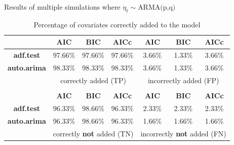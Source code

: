 \documentclass[10pt]{beamer}
\begin{document}
\begin{frame}{Results of multiple simulations where $\eta_t\sim\text{ARMA(p,q)}$}

    \begin{table}
        \centering\small 
        \renewcommand{\arraystretch}{1.3}
        \setlength{\tabcolsep}{10pt}
        \label{simulations1}
        \caption{Percentage of covariates correctly added to the model}
        \begin{tabular}{|c|ccc|ccc|}
            \cline{2-7}
            \multicolumn{1}{c|}{}   & \textbf{AIC}  & \textbf{BIC}  & \textbf{AICc}            & \textbf{AIC}      & \textbf{BIC}   & \textbf{AICc} \\
            \hline       
            \textbf{adf.test}       & 97.66\%       & 97.66\%        & 97.66\%                 & 3.66\%            & 1.33\%         & 3.66\%        \\
            \textbf{auto.arima}     & 98.33\%       & 98.33\%        & 98.33\%                 & 3.66\%            & 1.33\%         & 3.66\%        \\
            \hline
            \multicolumn{1}{|c|}{}   & \multicolumn{3}{c|}{correctly added (TP)}               & \multicolumn{3}{c|}{incorrectly added (FP)}         \\
            \hline 
            \multicolumn{7}{c}{}                                                                                                                    \\
            \cline{2-7}
            \multicolumn{1}{c|}{}   & \textbf{AIC}  & \textbf{BIC}  & \textbf{AICc}           & \textbf{AIC}      & \textbf{BIC}   & \textbf{AICc}  \\ 
            \hline        
            \textbf{adf.test}       & 96.33\%       & 98.66\%        & 96.33\%                & 2.33\%            & 2.33\%         & 2.33\%         \\
            \textbf{auto.arima}     & 96.33\%       & 98.66\%        & 96.33\%                & 1.66\%            & 1.66\%         & 1.66\%         \\
            \hline 
            \multicolumn{1}{|c|}{}   & \multicolumn{3}{c|}{correctly \textbf{not} added (TN)} & \multicolumn{3}{c|}{incorrectly \textbf{not} added (FN)}  \\
            \hline
        \end{tabular}
    \end{table}

    
    
\end{frame}
\end{document}

